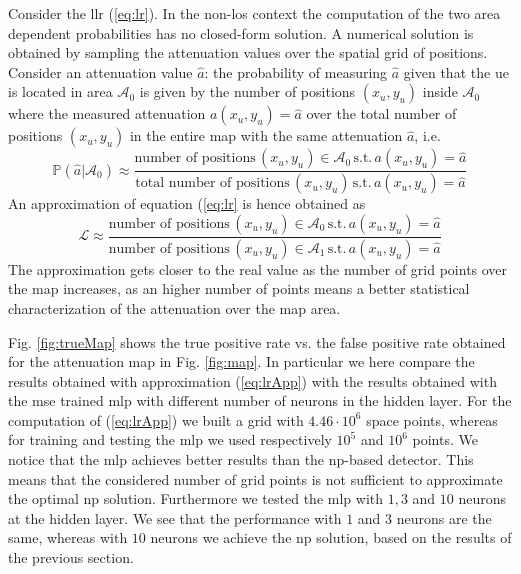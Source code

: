 \documentclass[draftcls,onecolumn,12pt]{IEEEtran}
\begin{document}
Consider the \ac{llr} (\ref{eq:lr}). In the non-\ac{los} context the computation of the two area dependent probabilities has no closed-form solution. A numerical solution is obtained by sampling the attenuation values over the spatial grid of positions. Consider an attenuation value $\hat{a}$: the probability of measuring $\hat{a}$ given that the \ac{ue} is located in area $\mathcal{A}_0$ is given by the number of positions $(x_u,y_u)$ inside $\mathcal{A}_0$ where the measured attenuation $a(x_u,y_u)=\hat{a}$ over the total number of positions $(x_u,y_u)$ in the entire map with the same attenuation $\hat{a}$, i.e.
\begin{equation}
    \mathbb{P}(\hat{a}|\mathcal{A}_0) \approx \frac{\text{number of positions} \, (x_u,y_u) \in \mathcal{A}_0 \, \text{s.t.} \, a(x_u,y_u) = \hat{a}}{\text{total number of positions} \, (x_u,y_u) \, \text{s.t.} \, a(x_u,y_u) = \hat{a}}
\end{equation}
An approximation of equation (\ref{eq:lr} is hence obtained as
\begin{equation}\label{eq:lrApp}
    \mathcal{L} \approx \frac{\text{number of positions} \, (x_u,y_u) \in \mathcal{A}_0 \, \text{s.t.} \, a(x_u,y_u) = \hat{a}}{\text{number of positions} \, (x_u,y_u) \in \mathcal{A}_1 \, \text{s.t.} \, a(x_u,y_u) = \hat{a}}
\end{equation}
The approximation gets closer to the real value as the number of grid points over the map increases, as an higher number of points means a better statistical characterization of the attenuation over the map area.

Fig. \ref{fig:trueMap} shows the true positive rate vs. the false positive rate obtained for the attenuation map in Fig. \ref{fig:map}. In particular we here compare the results obtained with approximation (\ref{eq:lrApp}) with the results obtained with the \ac{mse} trained \ac{mlp} with different number of neurons in the hidden layer.
For the computation of (\ref{eq:lrApp}) we built a grid with $4.46 \cdot 10^6$ space points, whereas for training and testing the \ac{mlp} we used respectively $10^5$ and $10^6$ points. We notice that the \ac{mlp} achieves better results than the \ac{np}-based detector. This means that the considered number of grid points is not sufficient to approximate the optimal \ac{np} solution. Furthermore we tested the \ac{mlp} with $1,3$ and $10$ neurons at the hidden layer. We see that the performance with $1$ and $3$ neurons are the same, whereas with $10$ neurons we achieve the \ac{np} solution, based on the results of the previous section. 
\end{document}
